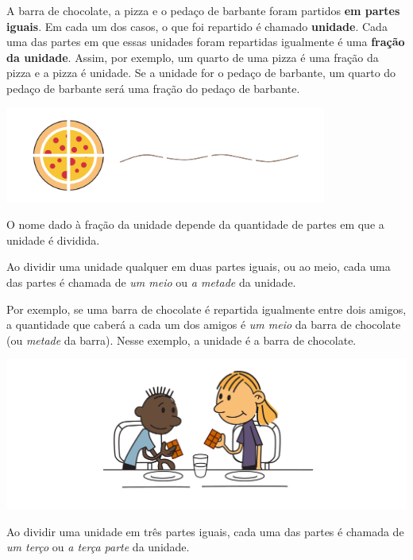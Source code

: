 A barra de chocolate, a pizza e o pedaço de barbante foram partidos {\bf em partes iguais}. 
Em cada um dos casos, o que foi repartido é chamado {\bf unidade}. Cada uma das partes em que essas unidades foram repartidas igualmente é uma {\bf fração da unidade}. Assim, por exemplo, um quarto de uma pizza é uma fração da pizza e a pizza é unidade. Se a unidade for o pedaço de barbante, um quarto do pedaço de barbante será uma fração do pedaço de barbante.

\begin{center}
    \includegraphics[width=300pt, keepaspectratio]{..//media/cap1/secoes/pngs_licao_01/orgideias_fig01.png}  
  \end{center}

O nome dado à fração da unidade depende da quantidade de partes em que a unidade é dividida. 

Ao dividir uma unidade qualquer em duas partes iguais, ou ao meio, cada uma das partes é chamada de {\it um meio} ou {\it a metade} da unidade. 

Por exemplo, se uma barra de chocolate é repartida igualmente entre dois amigos, a quantidade que caberá a cada um dos amigos é {\it um meio} da barra de chocolate (ou {\it metade} da barra). Nesse exemplo, a unidade é a barra de chocolate.

\begin{center}
    \includegraphics[width=400pt, keepaspectratio]{..//media/cap1/secoes/pngs_licao_01/orgideias_fig02.png}  
  \end{center}

Ao dividir uma unidade em três partes iguais, cada uma das partes é chamada de {\it um terço} ou {\it a terça parte} da unidade. 

